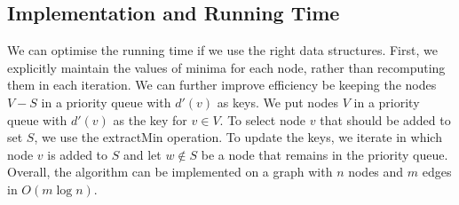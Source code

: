 \documentclass[a4paper]{article}
\theoremstyle{plain}
\theoremstyle{definition}
\theoremstyle{remark}
\begin{document}
	\subsection{Implementation and Running Time}
	We can optimise the running time if we use the right data structures. First, we explicitly maintain the values of minima for each node, rather than recomputing them in each iteration. We can further improve efficiency be keeping the nodes $V-S$ in a priority queue with $d'(v)$ as keys. We put nodes $V$ in a priority queue with $d'(v)$ as the key for $v\in V$. To select node $v$ that should be added to set $S$, we use the extractMin operation. To update the keys, we iterate in which node $v$ is added to $S$ and let $w \not\in S$ be a node that remains in the priority queue. Overall, the algorithm can be implemented on a graph with $n$ nodes and $m$ edges in $O(m \log n)$.
\end{document}
